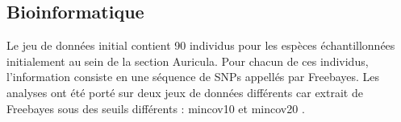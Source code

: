 \documentclass[12pt,a4paper,notitlepage]{article}
\begin{document}

\subsection{Bioinformatique}

Le jeu de données initial contient 90 individus pour les espèces échantillonnées initialement au sein de la section Auricula. Pour chacun de ces individus, l'information consiste en une séquence de SNPs appellés par Freebayes. Les analyses ont été porté sur deux jeux de données différents car extrait de Freebayes sous des seuils différents : mincov10 et mincov20 .
\end{document}
